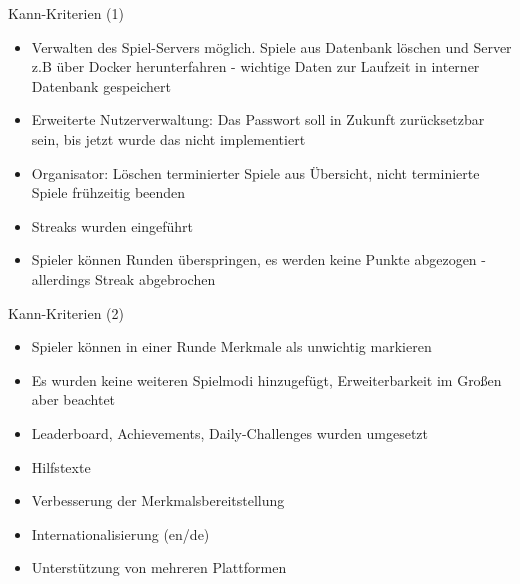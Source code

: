 \documentclass[xcolor=dvipsnames]{beamer}
\begin{document}
\begin{frame}{Kann-Kriterien (1)}
  \begin{itemize}
    \item Verwalten des Spiel-Servers möglich. Spiele aus Datenbank löschen und Server z.B über Docker herunterfahren - wichtige Daten zur Laufzeit in interner Datenbank gespeichert \\
    \item Erweiterte Nutzerverwaltung: Das Passwort soll in Zukunft zurücksetzbar sein, bis jetzt wurde das nicht implementiert \\
    \item Organisator: Löschen terminierter Spiele aus Übersicht, nicht terminierte Spiele frühzeitig beenden \\
    \item Streaks wurden eingeführt \\
    \item Spieler können Runden überspringen, es werden keine Punkte abgezogen - allerdings Streak abgebrochen \\
  \end{itemize}
\end{frame}
\begin{frame}{Kann-Kriterien (2)}
  \begin{itemize}
    \item Spieler können in einer Runde Merkmale als unwichtig markieren \\
    \item Es wurden keine weiteren Spielmodi hinzugefügt, Erweiterbarkeit im Großen aber beachtet \\
    \item Leaderboard, Achievements, Daily-Challenges wurden umgesetzt \\
    \item Hilfstexte \\
    \item Verbesserung der Merkmalsbereitstellung \\
    \item Internationalisierung (en/de) \\
    \item Unterstützung von mehreren Plattformen \\
  \end{itemize}
\end{frame}
\end{document}
